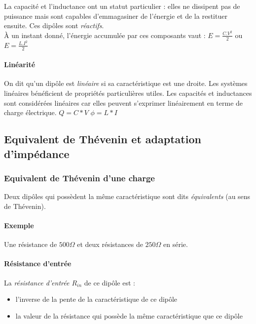 \documentclass[a4paper]{article}
\begin{document}
    La capacité et l'inductance ont un statut particulier : elles ne dissipent
    pas de puissance mais sont capables d'emmagasiner de l'énergie et de la 
    restituer ensuite. Ces dipôles sont \textit{réactifs}.\\

    \`A un instant donné, l'énergie accumulée par ces composants vaut : 
    $E = \frac{C.V^2}{2}$ ou $E = \frac{L.I^2}{2}$\\

    \paragraph{Linéarité} On dit qu'un dipôle est \textit{linéaire} si sa caractéristique est une droite. Les systèmes linéaires bénéficient de propriétés particulières utiles. Les capacités et inductances sont considérées linéaires car elles peuvent s'exprimer linéairement en terme de charge électrique.
    $Q=C*V$
    $\phi=L*I$

    \subsection{Equivalent de Thévenin et adaptation d'impédance}

    \subsubsection{Equivalent de Thévenin d'une charge}
    Deux dipôles qui possèdent la même caractéristique sont dits \textit{équivalents}
    (au sens de Thévenin). 

    \paragraph{Exemple} Une résistance de $500\Omega$ et deux résistances de $250\Omega$
    en série.

    \paragraph{Résistance d'entrée} La \textit{résistance d'entrée $R_{in}$} de ce
    dipôle est :
    \begin{itemize}
        \item l'inverse de la pente de la caractéristique de ce dipôle
        \item la valeur de la résistance qui possède la même caractéristique que ce dipôle
    \end{itemize}
\end{document}

